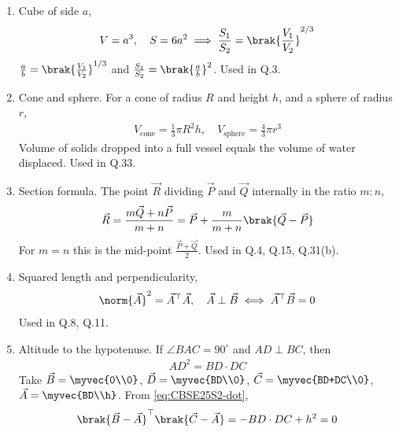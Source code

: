 \begin{enumerate}[label=\thesubsection.\arabic*, ref=\thesubsection.\theenumi]
\begin{align}
	\frac{LM}{AB} = \frac{MN}{BC} = \frac{LN}{AC} \label{eq:CBSE25S2-similar}
\end{align}
\item Cube of side $a$,
\begin{align}
	V = a^3, \quad S = 6a^2 \implies \frac{S_1}{S_2} = \brak{\frac{V_1}{V_2}}^{2/3} \label{eq:CBSE25S2-cube}
\end{align}
\solution
$\frac{a}{b} = \brak{\frac{V_1}{V_2}}^{1/3}$ and $\frac{S_1}{S_2} = \brak{\frac{a}{b}}^2$. Used in Q.3.
\item Cone and sphere. For a cone of radius $R$ and height $h$, and a sphere of radius $r$,
\begin{align}
	V_{\text{cone}} = \frac{1}{3}\pi R^2 h, \quad V_{\text{sphere}} = \frac{4}{3}\pi r^3 \label{eq:CBSE25S2-solids}
\end{align}
Volume of solids dropped into a full vessel equals the volume of water displaced. Used in Q.33.
\item Section formula. The point $\vec{R}$ dividing $\vec{P}$ and $\vec{Q}$ internally in the ratio $m:n$,
\begin{align}
	\vec{R} = \frac{m\vec{Q} + n\vec{P}}{m+n} = \vec{P} + \frac{m}{m+n}\brak{\vec{Q}-\vec{P}} \label{eq:CBSE25S2-section}
\end{align}
For $m = n$ this is the mid-point $\frac{\vec{P}+\vec{Q}}{2}$. Used in Q.4, Q.15, Q.31(b).
\item Squared length and perpendicularity,
\begin{align}
	\norm{\vec{A}}^2 = \vec{A}^{\top}\vec{A}, \quad \vec{A} \perp \vec{B} \iff \vec{A}^{\top}\vec{B} = 0 \label{eq:CBSE25S2-dot}
\end{align}
Used in Q.8, Q.11.
\item Altitude to the hypotenuse. If $\angle BAC = 90^\circ$ and $AD \perp BC$, then
\begin{align}
	AD^2 = BD \cdot DC \label{eq:CBSE25S2-altitude}
\end{align}
\solution
Take $\vec{B} = \myvec{0\\0}$, $\vec{D} = \myvec{BD\\0}$, $\vec{C} = \myvec{BD+DC\\0}$, $\vec{A} = \myvec{BD\\h}$. From \eqref{eq:CBSE25S2-dot},
\begin{align}
	\brak{\vec{B}-\vec{A}}^{\top}\brak{\vec{C}-\vec{A}} = -BD\cdot DC + h^2 = 0

\end{align}
\end{enumerate}
